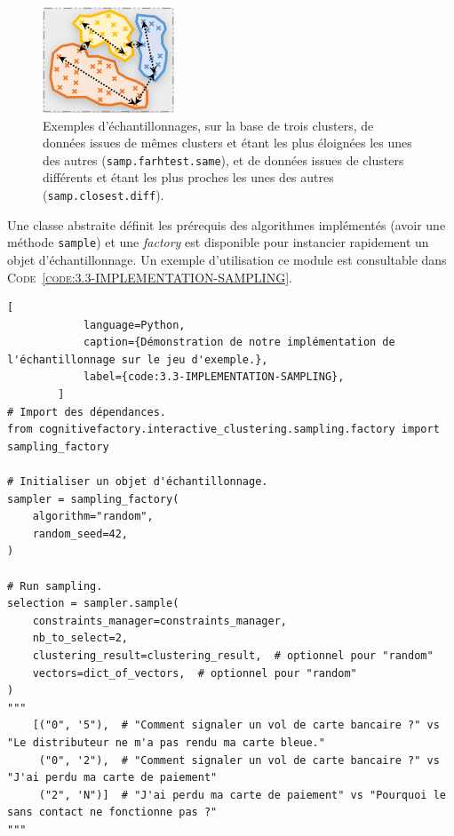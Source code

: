 		\begin{figure}[!htb]
			\centering
			\includegraphics[width=0.35\textwidth]{figures/example-sampling}
			\caption{Exemples d’échantillonnages, sur la base de trois clusters, de données issues de mêmes clusters et étant les plus éloignées les unes des autres (\texttt{samp.farhtest.same}), et de données issues de clusters différents et étant les plus proches les unes des autres (\texttt{samp.closest.diff}).}
			\label{figure:3.3-CONTRAINTES-SAMPLING}
		\end{figure}

		Une classe abstraite définit les prérequis des algorithmes implémentés (avoir une méthode \texttt{sample}) et une \textit{factory} est disponible pour instancier rapidement un objet d'échantillonnage.
		Un exemple d'utilisation ce module est consultable dans \textsc{Code~\ref{code:3.3-IMPLEMENTATION-SAMPLING}}.
		
		\begin{lstlisting}[
			language=Python,
			caption={Démonstration de notre implémentation de l'échantillonnage sur le jeu d'exemple.},
			label={code:3.3-IMPLEMENTATION-SAMPLING},
		]
# Import des dépendances.
from cognitivefactory.interactive_clustering.sampling.factory import sampling_factory

# Initialiser un objet d'échantillonnage.
sampler = sampling_factory(
	algorithm="random",
    random_seed=42,
)

# Run sampling.
selection = sampler.sample(
	constraints_manager=constraints_manager,
	nb_to_select=2,
	clustering_result=clustering_result,  # optionnel pour "random"
	vectors=dict_of_vectors,  # optionnel pour "random"
)
"""
	[("0", '5"),  # "Comment signaler un vol de carte bancaire ?" vs "Le distributeur ne m'a pas rendu ma carte bleue."
	 ("0", '2"),  # "Comment signaler un vol de carte bancaire ?" vs "J'ai perdu ma carte de paiement"
	 ("2", 'N")]  # "J'ai perdu ma carte de paiement" vs "Pourquoi le sans contact ne fonctionne pas ?"
"""
		\end{lstlisting}
		

